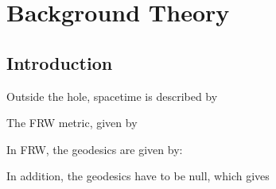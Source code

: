 
\chapter{Background Theory}

\label{ch:background}

\section{Introduction}

Outside the hole, spacetime is described by 

The FRW metric, given by 

In FRW, the geodesics are given by:

In addition, the geodesics have to be null, which gives 
